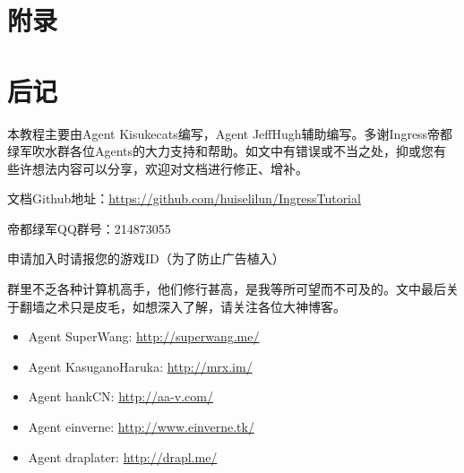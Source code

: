 \documentclass[a4paper]{article}
\begin{document}
\section{附录}

\section{后记}
本教程主要由Agent Kisukecats编写，Agent JeffHugh辅助编写。多谢Ingress帝都绿军吹水群各位Agents的大力支持和帮助。如文中有错误或不当之处，抑或您有些许想法内容可以分享，欢迎对文档进行修正、增补。\par

文档Github地址：\url{https://github.com/huiselilun/IngressTutorial}\par

帝都绿军QQ群号：214873055 \par
申请加入时请报您的游戏ID（为了防止广告植入）\par

群里不乏各种计算机高手，他们修行甚高，是我等所可望而不可及的。文中最后关于翻墙之术只是皮毛，如想深入了解，请关注各位大神博客。
\begin{itemize}
\item Agent SuperWang: \url{http://superwang.me/}
\item Agent KasuganoHaruka: \url{http://mrx.im/}
\item Agent hankCN: \url{http://aa-v.com/}
\item Agent einverne: \url{http://www.einverne.tk/}
\item Agent draplater: \url{http://drapl.me/}

\end{itemize}
\end{document}
